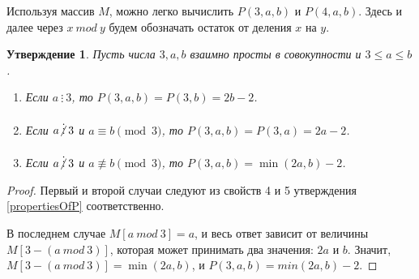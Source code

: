 \documentclass[12pt]{article}
\newtheorem{proposition}[theorem]{Утверждение}
\theoremstyle{definition}
\begin{document}
Используя массив $M$, можно легко вычислить $P(3, a, b)$ и $P(4, a, b)$. Здесь и далее через $x \ mod \ y$ будем обозначать  остаток от деления $x$ на $y$.

\begin{proposition}
Пусть числа $3, a, b$ взаимно просты в совокупности и $3 \le a \le b$.
\begin{enumerate}
\item Если $a \ \vdots \ 3$, то $P(3, a, b) = P(3, b) = 2b - 2$.
\item Если $a \centernot\vdots 3$ и $a \equiv b \pmod 3$, то $P(3, a, b) = P(3, a) = 2a - 2$.
\item Если $a \centernot\vdots 3$ и $a \not \equiv b \pmod 3$, то $P(3, a, b) = \min(2a, b) - 2$.
\end{enumerate}
\end{proposition}
\begin{proof}
Первый и второй случаи следуют из свойств 4 и 5 утверждения \ref{propertiesOfP} соответственно.

В последнем случае $M[a \ mod \ 3] = a$, и весь ответ зависит от величины $M[3 - (a \ mod \ 3)]$, которая может принимать два значения: $2a$ и $b$. Значит, $M[3 - (a \ mod \ 3)] = \min(2a, b)$, и $P(3, a, b) = min(2a, b) - 2$.
\end{proof}
\end{document}
